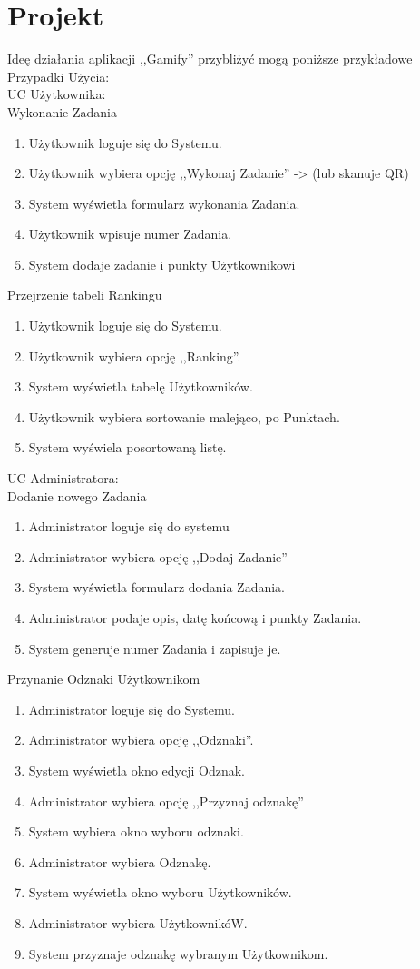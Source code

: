 \documentclass[a4paper,12pt,twoside,openany]{report}
\begin{document}
	\section{Projekt}
	Ideę działania aplikacji ,,Gamify'' przybliżyć mogą poniższe przykładowe Przypadki Użycia:\\
	UC Użytkownika:\\
	Wykonanie Zadania
	\begin{enumerate}
		\item Użytkownik loguje się do Systemu.
		\item Użytkownik wybiera opcję ,,Wykonaj Zadanie'' -> (lub skanuje QR)
		\item System wyświetla formularz wykonania Zadania.
		\item Użytkownik wpisuje numer Zadania.
		\item System dodaje zadanie i punkty Użytkownikowi
	\end{enumerate}
	Przejrzenie tabeli Rankingu
	\begin{enumerate}
		\item Użytkownik loguje się do Systemu.
		\item Użytkownik wybiera opcję ,,Ranking''.
		\item System wyświetla tabelę Użytkowników.
		\item Użytkownik wybiera sortowanie malejąco, po Punktach.
		\item System wyświela posortowaną listę.
	\end{enumerate}
	UC Administratora:\\
	Dodanie nowego Zadania
	\begin{enumerate}
		\item Administrator loguje się do systemu
		\item Administrator wybiera opcję ,,Dodaj Zadanie''
		\item System wyświetla formularz dodania Zadania.
		\item Administrator podaje opis, datę końcową i punkty Zadania.
		\item System generuje numer Zadania i zapisuje je.
	\end{enumerate}
	Przynanie Odznaki Użytkownikom
	\begin{enumerate}
		\item Administrator loguje się do Systemu.
		\item Administrator wybiera opcję ,,Odznaki''.
		\item System wyświetla okno edycji Odznak.
		\item Administrator wybiera opcję ,,Przyznaj odznakę''
		\item System wybiera okno wyboru odznaki.
		\item Administrator wybiera Odznakę.
		\item System wyświetla okno wyboru Użytkowników.
		\item Administrator wybiera UżytkownikóW.
		\item System przyznaje odznakę wybranym Użytkownikom.
	\end{enumerate}
\end{document}
